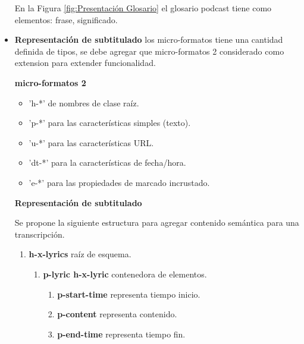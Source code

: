 \begin{itemize}
En la Figura \ref{fig:Presentación Glosario} el glosario podcast tiene como
elementos: frase, significado. 

\begin{minipage}{1.0\textwidth}
	\centering
	\label{fig:Presentación Glosario}
\end{minipage}


\item \textbf{Representación de subtitulado} los micro-formatos tiene una
cantidad definida de tipos, se debe agregar que micro-formatos 2 considerado
como extension para extender funcionalidad. 

\textbf{micro-formatos 2}

\begin{itemize}

\item 'h-*' de nombres de clase raíz.
\item 'p-*' para las características simples (texto).
\item 'u-*' para las características URL.
\item 'dt-*' para la características de fecha/hora.
\item 'e-*' para las propiedades de marcado incrustado. \cite{microformats2}
 
\end{itemize}

\textbf{Representación de subtitulado}

Se propone la siguiente estructura para agregar contenido semántica para una
transcripción.


\begin{enumerate}

\item \textbf{h-x-lyrics} raíz de esquema.

	\begin{enumerate}
	
		\item \textbf{p-lyric h-x-lyric} contenedora de elementos.
		
			\begin{enumerate}

				\item \textbf{p-start-time} representa tiempo inicio.
				\item \textbf{p-content} representa contenido.
				\item \textbf{p-end-time} representa tiempo fin.			


\end{enumerate}
\end{enumerate}
\end{enumerate}
\end{itemize}
